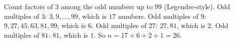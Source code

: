 Count factors of $3$ among the odd numbers up to $99$ (Legendre-style). Odd multiples of $3$: $3,9,\dots,99$, which is $17$ numbers. Odd multiples of $9$: $9,27,45,63,81,99$, which is $6$. Odd multiples of $27$: $27,81$, which is $2$. Odd multiples of $81$: $81$, which is $1$. So $n=17+6+2+1=\boxed{26}$.
